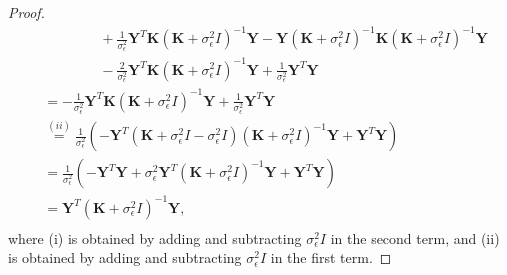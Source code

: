 \documentclass{article}
\theoremstyle{definition}
\theoremstyle{remark}
\begin{document}
\begin{proof}
\begin{equation}
\begin{split}
	&\qquad\qquad + \frac{1}{\sigma_{\epsilon}^2} \mathbf{Y}^T \mathbf{K} (\mathbf{K}+\sigma_{\epsilon}^2 I)^{-1} \mathbf{Y} - \mathbf{Y} (\mathbf{K}+\sigma_{\epsilon}^2 I)^{-1} \mathbf{K} (\mathbf{K}+\sigma_{\epsilon}^2 I)^{-1} \mathbf{Y} \\
	&\qquad\qquad - \frac{2}{\sigma_{\epsilon}^2} \mathbf{Y}^T \mathbf{K} (\mathbf{K}+\sigma_{\epsilon}^2 I)^{-1} \mathbf{Y}  + \frac{1}{\sigma_{\epsilon}^2} \mathbf{Y}^T \mathbf{Y}\\
	&= -\frac{1}{\sigma_{\epsilon}^2} \mathbf{Y}^T \mathbf{K} (\mathbf{K}+\sigma_{\epsilon}^2 I)^{-1} \mathbf{Y} +\frac{1}{\sigma_{\epsilon}^2} \mathbf{Y}^T \mathbf{Y} \\
	& \stackrel{(ii)}{=} \frac{1}{\sigma_{\epsilon}^2} \left( - \mathbf{Y}^T (\mathbf{K} + \sigma_{\epsilon}^2 I - \sigma_{\epsilon}^2 I) (\mathbf{K}+\sigma_{\epsilon}^2 I)^{-1} \mathbf{Y} +  \mathbf{Y}^T \mathbf{Y} \right) \\
	&= \frac{1}{\sigma_{\epsilon}^2} \left( - \mathbf{Y}^T \mathbf{Y} + \sigma_{\epsilon}^2 \mathbf{Y}^T (\mathbf{K} + \sigma_{\epsilon}^2 I)^{-1} \mathbf{Y} +  \mathbf{Y}^T \mathbf{Y} \right) \\
&=  \mathbf{Y}^T (\mathbf{K} + \sigma_{\epsilon}^2 I)^{-1} \mathbf{Y}, \\
\end{split} \end{equation}
where (i) is obtained by adding and subtracting $\sigma_{\epsilon}^2 I$ in the second term, and (ii) is obtained by adding and subtracting $\sigma_{\epsilon}^2 I$ in the first term.
\end{proof}
\end{document}

